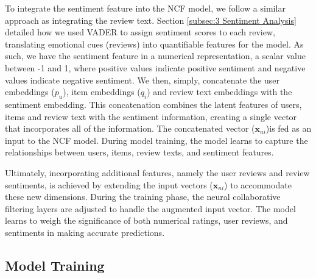 To integrate the sentiment feature into the NCF model, we follow a similar approach as integrating the review text. Section \ref{subsec:3 Sentiment Analysis} detailed how we used VADER to assign sentiment scores to each review, translating emotional cues (reviews) into quantifiable features for the model. As such, we have the sentiment feature in a numerical representation, a scalar value between -1 and 1, where positive values indicate positive sentiment and negative values indicate negative sentiment. We then, simply, concatenate the user embeddings ($p_u$), item embeddings ($q_i$) and review text embeddings with the sentiment embedding.  This concatenation combines the latent features of users, items and review text with the sentiment information, creating a single vector that incorporates all of the information. The concatenated vector ($\mathbf{x}_{ui}$)is fed as an input to the NCF model. During model training, the model learns to capture the relationships between users, items, review texts, and sentiment features.

Ultimately, incorporating additional features, namely the user reviews and review sentiments, is achieved by extending the input vectors ($\mathbf{x}_{ui}$) to accommodate these new dimensions. During the training phase, the neural collaborative filtering layers are adjusted to handle the augmented input vector. The model learns to weigh the significance of both numerical ratings, user reviews, and sentiments in making accurate predictions.


\subsection{Model Training}
\label{subsec:4 Model Training}


